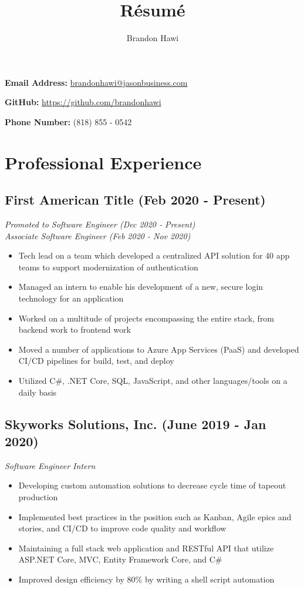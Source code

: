 \documentclass[10pt]{article}
\makeatletter
\renewcommand{\maketitle}
{
\huge
\noindent\textbf{\theauthor} \hfill \small{ \textbf{Email Address: }\href{mailto:brandonhawi@jasonbusiness.com}{brandonhawi@jasonbusiness.com}

\hfill \textbf{GitHub: }\href{https://github.com/brandonhawi}{https://github.com/brandonhawi}

\hfill \textbf{Phone Number: }(818) 855 - 0542}}
\makeatother
\begin{document}
\title{R\'esum\'e}
\author{Brandon Hawi}

\maketitle
\vspace{-0.1in}

\section{Professional Experience}

\subsection{First American Title (Feb 2020 - Present)}

\noindent\textit{Promoted to Software Engineer (Dec 2020 - Present)}\\
\noindent\textit{Associate Software Engineer (Feb 2020 - Nov 2020)}

\begin{itemize}
	\setlength\itemsep{0em}
	\item Tech lead on a team which developed a centralized API solution for 40 app teams to support modernization of authentication
	\item Managed an intern to enable his development of a new,  secure login technology for an application
	\item Worked on a multitude of projects encompassing the entire stack, from backend work to frontend work
	\item Moved a number of applications to Azure App Services (PaaS) and developed CI/CD pipelines for build, test, and deploy
	\item Utilized C\#,  .NET Core,  SQL,  JavaScript,  and other languages/tools on a daily basis
\end{itemize}

\subsection{Skyworks Solutions, Inc. (June 2019 - Jan 2020)}

\noindent\textit{Software Engineer Intern}

\begin{itemize}
	\setlength\itemsep{0em}
	\item Developing custom automation solutions to decrease cycle time of tapeout production
	\item Implemented best practices in the position such as Kanban, Agile epics and stories, and CI/CD to improve code quality and workflow
	\item Maintaining a full stack web application and RESTful API that utilize ASP.NET Core, MVC, Entity Framework Core, and C\#
	\item Improved design efficiency by 80\% by writing a shell script automation
\end{itemize}
\end{document}
